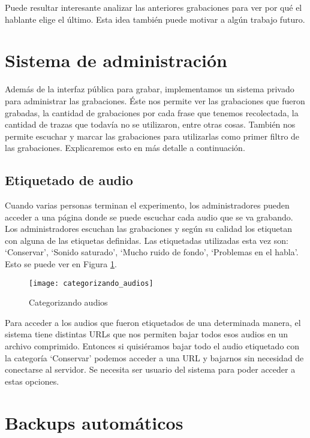 Puede resultar interesante analizar las anteriores grabaciones para ver por qué el hablante elige el último. Esta idea también puede motivar a algún trabajo futuro.

\section{Sistema de administración}

Además de la interfaz pública para grabar, implementamos un sistema privado para administrar las grabaciones. Éste nos permite ver las grabaciones que fueron grabadas, la cantidad de grabaciones por cada frase que tenemos recolectada, la cantidad de trazas que todavía no se utilizaron, entre otras cosas. También nos permite escuchar y marcar las grabaciones para utilizarlas como primer filtro de las grabaciones. Explicaremos esto en más detalle a continuación.

\subsection{Etiquetado de audio}

Cuando varias personas terminan el experimento, los administradores pueden acceder a una página donde se puede escuchar cada audio que se va grabando. Los administradores escuchan las grabaciones y según su calidad los etiquetan con alguna de las etiquetas definidas. Las etiquetadas utilizadas esta vez son: `Conservar’,  `Sonido saturado’, `Mucho ruido de fondo’, `Problemas en el habla’. Esto se puede ver en Figura \ref{cat}.

\begin{figure}[h!]
    \centerline{\texttt{[image: categorizando\_audios]} }
    \caption{Categorizando audios}
    \label{cat}
\end{figure}

Para acceder a los audios que fueron etiquetados de una determinada manera, el sistema tiene distintas URLs que nos permiten bajar todos esos audios en un archivo comprimido. Entonces si quisiéramos bajar todo el audio etiquetado con la categoría `Conservar’ podemos acceder a una URL y bajarnos sin necesidad de conectarse al servidor. Se necesita ser usuario del sistema para poder acceder a estas opciones.

\section{Backups automáticos}

